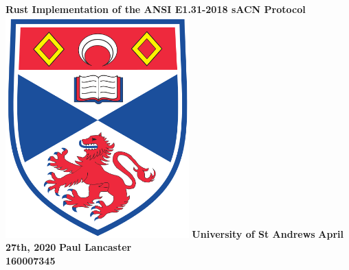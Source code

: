 \begin{titlepage}
	\begin{center}
		\vspace*{2cm}
		\textbf{Rust Implementation of the ANSI E1.31-2018 sACN Protocol}
		\vspace{2cm}
		\linebreak
		\includegraphics*[width=200pt]{st_a}
		\vspace{1cm}
		\linebreak
		\textbf{University of St Andrews}
		\linebreak
		\vspace{1cm}
		\textbf{April 27th, 2020}
		\linebreak
		\vspace{1cm}
		\textbf{Paul Lancaster\\}
		\textbf{160007345}
	\end{center}
\end{titlepage}